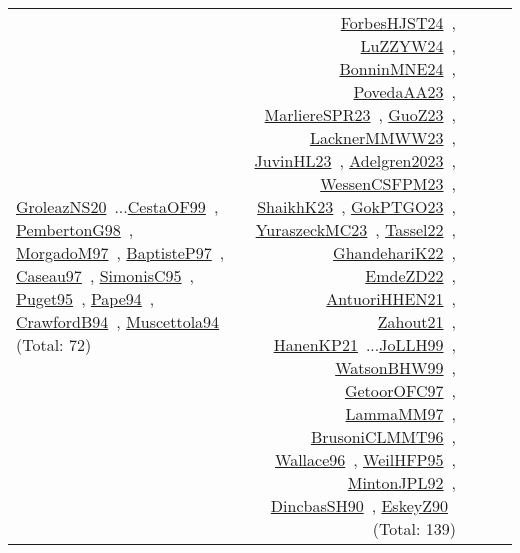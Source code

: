 {\begin{longtable}{p{3cm}r>{\raggedright\arraybackslash}p{6cm}>{\raggedright\arraybackslash}p{6cm}>{\raggedright\arraybackslash}p{8cm}}
\href{../works/GroleazNS20.pdf}{GroleazNS20}~\cite{GroleazNS20}...\href{../works/CestaOF99.pdf}{CestaOF99}~\cite{CestaOF99}, \href{../works/PembertonG98.pdf}{PembertonG98}~\cite{PembertonG98}, \href{../works/MorgadoM97.pdf}{MorgadoM97}~\cite{MorgadoM97}, \href{../works/BaptisteP97.pdf}{BaptisteP97}~\cite{BaptisteP97}, \href{../works/Caseau97.pdf}{Caseau97}~\cite{Caseau97}, \href{../works/SimonisC95.pdf}{SimonisC95}~\cite{SimonisC95}, \href{../works/Puget95.pdf}{Puget95}~\cite{Puget95}, \href{../works/Pape94.pdf}{Pape94}~\cite{Pape94}, \href{../works/CrawfordB94.pdf}{CrawfordB94}~\cite{CrawfordB94}, \href{../works/Muscettola94.pdf}{Muscettola94}~\cite{Muscettola94} (Total: 72) & \href{../works/ForbesHJST24.pdf}{ForbesHJST24}~\cite{ForbesHJST24}, \href{../works/LuZZYW24.pdf}{LuZZYW24}~\cite{LuZZYW24}, \href{../works/BonninMNE24.pdf}{BonninMNE24}~\cite{BonninMNE24}, \href{../works/PovedaAA23.pdf}{PovedaAA23}~\cite{PovedaAA23}, \href{../works/MarliereSPR23.pdf}{MarliereSPR23}~\cite{MarliereSPR23}, \href{../works/GuoZ23.pdf}{GuoZ23}~\cite{GuoZ23}, \href{../works/LacknerMMWW23.pdf}{LacknerMMWW23}~\cite{LacknerMMWW23}, \href{../works/JuvinHL23.pdf}{JuvinHL23}~\cite{JuvinHL23}, \href{../works/Adelgren2023.pdf}{Adelgren2023}~\cite{Adelgren2023}, \href{../works/WessenCSFPM23.pdf}{WessenCSFPM23}~\cite{WessenCSFPM23}, \href{../works/ShaikhK23.pdf}{ShaikhK23}~\cite{ShaikhK23}, \href{../works/GokPTGO23.pdf}{GokPTGO23}~\cite{GokPTGO23}, \href{../works/YuraszeckMC23.pdf}{YuraszeckMC23}~\cite{YuraszeckMC23}, \href{../works/Tassel22.pdf}{Tassel22}~\cite{Tassel22}, \href{../works/GhandehariK22.pdf}{GhandehariK22}~\cite{GhandehariK22}, \href{../works/EmdeZD22.pdf}{EmdeZD22}~\cite{EmdeZD22}, \href{../works/AntuoriHHEN21.pdf}{AntuoriHHEN21}~\cite{AntuoriHHEN21}, \href{../works/Zahout21.pdf}{Zahout21}~\cite{Zahout21}, \href{../works/HanenKP21.pdf}{HanenKP21}~\cite{HanenKP21}...\href{../works/JoLLH99.pdf}{JoLLH99}~\cite{JoLLH99}, \href{../works/WatsonBHW99.pdf}{WatsonBHW99}~\cite{WatsonBHW99}, \href{../works/GetoorOFC97.pdf}{GetoorOFC97}~\cite{GetoorOFC97}, \href{../works/LammaMM97.pdf}{LammaMM97}~\cite{LammaMM97}, \href{../works/BrusoniCLMMT96.pdf}{BrusoniCLMMT96}~\cite{BrusoniCLMMT96}, \href{../works/Wallace96.pdf}{Wallace96}~\cite{Wallace96}, \href{../works/WeilHFP95.pdf}{WeilHFP95}~\cite{WeilHFP95}, \href{../works/MintonJPL92.pdf}{MintonJPL92}~\cite{MintonJPL92}, \href{../works/DincbasSH90.pdf}{DincbasSH90}~\cite{DincbasSH90}, \href{../works/EskeyZ90.pdf}{EskeyZ90}~\cite{EskeyZ90} (Total: 139)\\

\end{longtable}}
